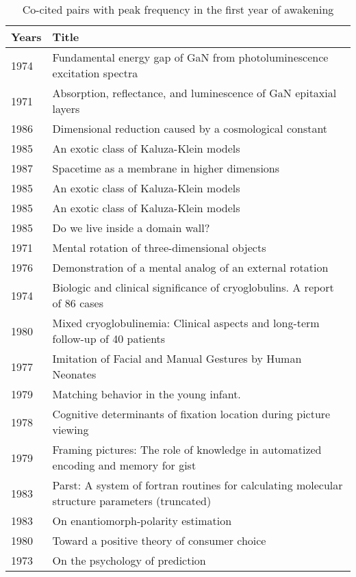 \documentclass[utf8]{frontiersSCNS}
\newcommand\Tstrut{\rule{0pt}{2.9ex}} %
\begin{document}
\begin{table}[ht]
\caption{Co-cited pairs with peak frequency in the first year of awakening}%
\centering %
\begin{center}
\begin{tabular}{ll} 
\hline %
Years & Title \Tstrut\\
\hline 
\tiny{1974} & \tiny{Fundamental energy gap of GaN from photoluminescence excitation spectra} \Tstrut\\
\tiny{1971} &  \tiny{Absorption, reflectance, and luminescence of GaN epitaxial layers} \\
\hline
\tiny{1986} & \tiny{Dimensional reduction caused by a cosmological constant} \\
\tiny{1985} & \tiny{An exotic class of Kaluza-Klein models} \\
\hline
\tiny{1987} & \tiny{Spacetime as a membrane in higher dimensions} \\
\tiny{1985} & \tiny{An exotic class of Kaluza-Klein models} \\
\hline 
\tiny{1985} & \tiny{An exotic class of Kaluza-Klein models} \\
\tiny{1985} & \tiny{Do we live inside a domain wall?} \\
\hline
\tiny{1971} & \tiny{Mental rotation of three-dimensional objects} \\
\tiny{1976} & \tiny{Demonstration of a mental analog of an external rotation} \\
\hline
\tiny{1974} & \tiny{Biologic and clinical significance of cryoglobulins. A report of 86 cases} \\
\tiny{1980} & \tiny{Mixed cryoglobulinemia: Clinical aspects and long-term follow-up of 40 patients} \\
\hline
\tiny{1977} & \tiny{Imitation of Facial and Manual Gestures by Human Neonates} \\
\tiny{1979} & \tiny{Matching behavior in the young infant.} \\ 
\hline
\tiny{1978} & \tiny{Cognitive determinants of fixation location during picture viewing} \\
\tiny{1979} & \tiny{Framing pictures: The role of knowledge in automatized encoding and memory for gist} \\
\hline
\tiny{1983} & \tiny{Parst: A system of fortran routines for calculating molecular structure parameters (truncated)} \\
\tiny{1983} & \tiny{On enantiomorph‐polarity estimation} \\
\hline
\tiny{1980} & \tiny{Toward a positive theory of consumer choice} \\
\tiny{1973} & \tiny{On the psychology of prediction} \\
\hline 
\end{tabular}
\end{center}
\label{tab:table3} %
\end{table}
\end{document}
